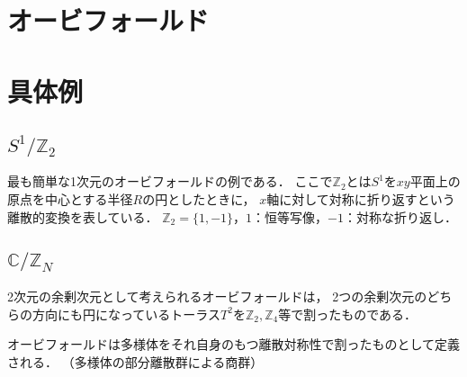 \documentclass[dvipdfmx,uplatex]{jsarticle}
\numberwithin{theorem}{section}
\numberwithin{reibangou}{section}
\numberwithin{reidaibangou}{section}
\numberwithin{mondaibangou}{section}
\newcommand{\Cbb}{\mathbb{C}}
\newcommand{\Zbb}{\mathbb{Z}}
\begin{document}
\section{オービフォールド}

\section{具体例}

\subsection{\texorpdfstring{$S^1/\Zbb_2$}{S1/Z2}}
最も簡単な1次元のオービフォールドの例である．
ここで$\Zbb_2$とは$S^1$を$xy$平面上の原点を中心とする半径$R$の円としたときに，
$x$軸に対して対称に折り返すという離散的変換を表している．
$\Zbb_2 = \{ 1, -1\}$，$1$：恒等写像，$-1$：対称な折り返し．

\subsection{\texorpdfstring{$\Cbb/\Zbb_N$}{C/ZN}}

2次元の余剰次元として考えられるオービフォールドは，
2つの余剰次元のどちらの方向にも円になっているトーラス$T^2$を$\Zbb_2, \Zbb_4$等で割ったものである．

オービフォールドは多様体をそれ自身のもつ離散対称性で割ったものとして定義される．
（多様体の部分離散群による商群）

\cite{日置qft}



\end{document}
